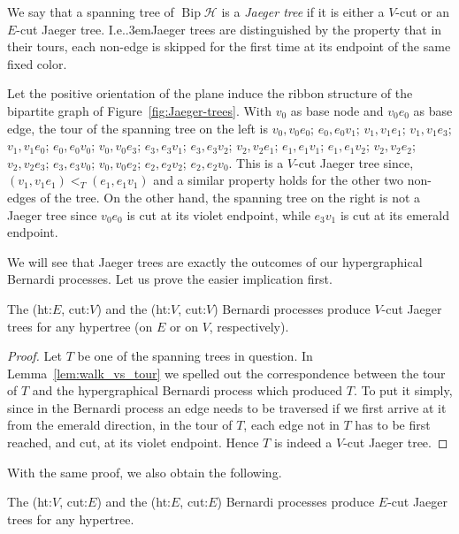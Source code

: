 \documentclass[ALCO,ThmDefs,Unicode,epreuves]{cedram}
\newcommand{\HH}{\mathcal H}
\newcommand\Ie{I.e.\kern.3em}
\DeclareMathOperator{\Bip}{Bip}
\begin{document}
We say that a spanning tree of $\Bip \HH$ is a \emph{Jaeger tree} if it is either a $V$-cut or an $E$-cut Jaeger tree. \Ie Jaeger trees are distinguished by the property that in their tours, each non-edge is skipped for the first time at its endpoint of the same fixed color. 

\begin{exam}
\label{ex:kektura}
Let the positive orientation of the plane induce the ribbon structure of the bipartite graph of Figure~\ref{fig:Jaeger-trees}. With $v_0$ as base node and $v_0e_0$ as base edge, the tour of the spanning tree on the left is $v_0, v_0e_0$; $e_0,e_0v_1$; $v_1, v_1e_1$; $v_1, v_1e_3$; $v_1, v_1e_0$; $e_0,e_0v_0$; $v_0,v_0e_3$; $e_3,e_3v_1$; $e_3,e_3v_2$; $v_2, v_2e_1$; $e_1, e_1v_1$; $e_1, e_1v_2$; $v_2, v_2e_2$; $v_2,v_2e_3$; $e_3, e_3v_0$; $v_0, v_0e_2$; $e_2, e_2v_2$; $e_2, e_2v_0$. This is a $V$-cut Jaeger tree since, \eg $(v_1,v_1e_1)<_T (e_1, e_1v_1)$ and a similar property holds for the other two non-edges of the tree. On the other hand, the spanning tree on the right is not a Jaeger tree since $v_0e_0$ is cut at its violet endpoint, while $e_3v_1$ is cut at its emerald endpoint.
\end{exam}

We will see that Jaeger trees are exactly the outcomes of our hypergraphical Bernardi processes. Let us prove the easier implication first.

\begin{prop}
\label{prop:bernardi->jaeger}
The (ht:$E$, cut:$V$) and the (ht:$V$, cut:$V$) Bernardi processes produce $V$-cut Jaeger trees for any hypertree (on $E$ or on $V$, respectively).
\end{prop}

\begin{proof}
Let $T$ be one of the spanning trees in question. In Lemma~\ref{lem:walk_vs_tour} we spelled out the correspondence between the tour of $T$ and the hypergraphical Bernardi process which produced $T$. To put it simply, since in the Bernardi process an edge needs to be traversed if we first arrive at it from the emerald direction, in the tour of $T$, each edge not in $T$ has to be first reached, and cut, at its violet endpoint. Hence $T$ is indeed a $V$-cut Jaeger tree.
\end{proof}

With the same proof, we also obtain the following.

\begin{prop} \label{p:B-trees_are_J-trees}
The (ht:$V$, cut:$E$) and the (ht:$E$, cut:$E$) Bernardi processes produce $E$-cut Jaeger trees for any hypertree.
\end{prop}
\end{document}
